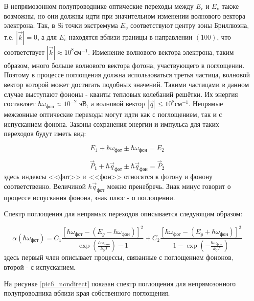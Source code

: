 В непрямозонном полупроводнике оптические переходы между $E_{c}$ и $E_{v}$ также возможны, но они должны идти при значительном изменении волнового вектора электрона. Так, в Si точки экстремума $E_{v}$ соответствуют центру зоны Бриллюэна, т.е. $|\overrightarrow{k}| = 0$, а для $E_{c}$ находятся вблизи границы в направлении $(100)$, что соответствует $|\overrightarrow{k}| \approx 10^8 \text{см}^{-1}$. Изменение волнового вектора электрона, таким образом, много больше волнового вектора фотона, участвующего в поглощении. Поэтому в процессе поглощения должна использоваться третья частица, волновой вектор которой может достигать подобных значений. Такими частицами в данном случае выступают фононы - кванты тепловых колебаний решётки. Их энергия составляет $\hbar \omega_{\text{фон}} \approx 10^{-2}$ эВ, а волновой вектор $|\overrightarrow{q}| \le 10^{8} \text{см}^{-1}$. Непрямые межзонные оптические переходы могут идти как с поглощением, так и с испусканием фонона. Законы сохранения энергии и импульса для таких переходов будут иметь вид:

\begin{equation}
E_{1} + \hbar \omega_{\text{фот}} \pm \hbar \omega_{\text{фон}} = E_{2}
\end{equation}

\begin{equation}
\overrightarrow{P}_{1} + \hbar \overrightarrow{q}_{\text{фот}} \pm \hbar \overrightarrow{q}_{\text{фон}} = \overrightarrow{P}_{2}
\end{equation}
здесь индексы <<фот>> и <<фон>> относятся к фотону и фонону соответственно. Величиной $\hbar \overrightarrow{q}_{\text{фот}}$ можно пренебречь. Знак минус говорит о процессе испускания фонона, знак плюс - о поглощении.

Спектр поглощения для непрямых переходов описывается следующим образом:

\begin{equation}
\alpha(\hbar \omega_{\text{фот}}) =
C_{1} \frac{\left[ \hbar \omega_{\text{фот}} - (E_{g}-\hbar \omega_{\text{фон}}) \right]^{2}}{\exp \left( \frac{\hbar \omega_{\text{фон}}}{k_{0} T} \right) - 1} +
C_{2} \frac{\left[ \hbar \omega_{\text{фот}} - (E_{g}+\hbar \omega_{\text{фон}}) \right]^{2}}{1 - \exp \left( -\frac{\hbar \omega_{\text{фон}}}{k_{0} T} \right)}
\end{equation}
здесь первый член описывает процессы, связанные с поглощением фононов, второй - с испусканием.

На рисунке \ref{pic6_nondirect} показан спектр поглощения для непрямозонного полупроводника вблизи края собственного поглощения.

